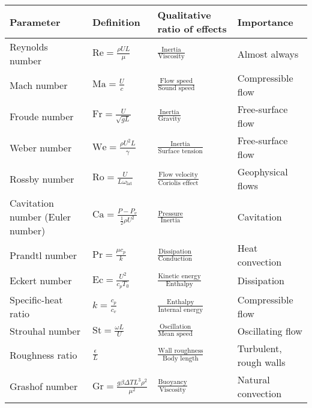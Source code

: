 \documentclass{report}
\begin{document}
\begin{center}
    \begin{tabular}{|>{\centering\arraybackslash}p{3cm}|
                    >{\centering\arraybackslash}p{3.8cm}|
                    >{\centering\arraybackslash}p{4.5cm}|
                    >{\centering\arraybackslash}p{3cm}|}
    \hline
    \textbf{Parameter} & \textbf{Definition} & \textbf{Qualitative ratio of effects} & \textbf{Importance} \\ \hline
    Reynolds number & $\text{Re} = \frac{\rho U L}{\mu}$ & $\frac{\text{Inertia}}{\text{Viscosity}}$ & Almost always \\ \hline
    Mach number & $\text{Ma} = \frac{U}{c}$ & $\frac{\text{Flow speed}}{\text{Sound speed}}$ & Compressible flow \\ \hline
    Froude number & $\text{Fr} = \frac{U}{\sqrt{gL}}$ & $\frac{\text{Inertia}}{\text{Gravity}}$ & Free-surface flow \\ \hline
    Weber number & $\text{We} = \frac{\rho U^2 L}{\gamma}$ & $\frac{\text{Inertia}}{\text{Surface tension}}$ & Free-surface flow \\ \hline
    Rossby number & $\text{Ro} = \frac{U}{L \omega_{\text{lat}}}$ & $\frac{\text{Flow velocity}}{\text{Coriolis effect}}$ & Geophysical flows \\ \hline
    Cavitation number (Euler number) & $\text{Ca} = \frac{P - P_v}{\frac{1}{2} \rho U^2}$ & $\frac{\text{Pressure}}{\text{Inertia}}$ & Cavitation \\ \hline
    Prandtl number & $\text{Pr} = \frac{\mu c_p}{k}$ & $\frac{\text{Dissipation}}{\text{Conduction}}$ & Heat convection \\ \hline
    Eckert number & $\text{Ec} = \frac{U^2}{c_p T_0}$ & $\frac{\text{Kinetic energy}}{\text{Enthalpy}}$ & Dissipation \\ \hline
    Specific-heat ratio & $k = \frac{c_p}{c_v}$ & $\frac{\text{Enthalpy}}{\text{Internal energy}}$ & Compressible flow \\ \hline
    Strouhal number & $\text{St} = \frac{\omega L}{U}$ & $\frac{\text{Oscillation}}{\text{Mean speed}}$ & Oscillating flow \\ \hline
    Roughness ratio & $\frac{\epsilon}{L}$ & $\frac{\text{Wall roughness}}{\text{Body length}}$ & Turbulent, rough walls \\ \hline
    Grashof number & $\text{Gr} = \frac{g \beta \Delta T L^3 \rho^2}{\mu^2}$ & $\frac{\text{Buoyancy}}{\text{Viscosity}}$ & Natural convection \\ \hline

\end{tabular}
\end{center}
\end{document}
